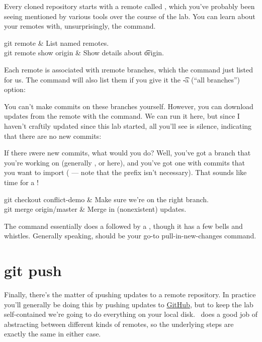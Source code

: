 \documentclass[letterpaper,12pt,titlepage,twoside]{article}
\begin{document}
Every cloned repository starts with a remote called , which you've
probably been seeing mentioned by various tools over the course of the lab.
You can learn about your remotes with, unsurprisingly, the 
command.

\begin{typeme}
git remote & List named remotes. \\
git remote show origin & Show details about \t{origin}.
\end{typeme}

Each remote is associated with \i{remote branches}, which the  command just listed for us. The  command will also list
them if you give it the \t{-a} (``all branches'') option:


You can't make commits on these branches yourself. However, you can download
updates from the remote with the  command. We can run it here, but
since I haven't craftily updated  since this lab started, all you'll
see is silence, indicating that there are no new commits:


If there \i{were} new commits, what would you do? Well, you've got a branch
that you're working on (generally , or  here), and
you've got one with commits that you want to import ( ---
note that the  prefix isn't necessary). That sounds like time for
a !

\begin{typeme}
git checkout conflict-demo & Make sure we're on the right branch. \\
git merge origin/master & Merge in (nonexistent) updates.
\end{typeme}

The command  essentially does a  followed by a
, though it has a few bells and whistles. Generally speaking,
 should be your go-to pull-in-new-changes command.



\section{git push}

Finally, there's the matter of \i{pushing} updates to a remote repository. In
practice you'll generally be doing this by pushing updates to
\href{https://github.com/}{GitHub}, but to keep the lab self-contained we're
going to do everything on your local disk. \git\ does a good job of
abstracting between different kinds of remotes, so the underlying steps are
exactly the same in either case.
\end{document}
